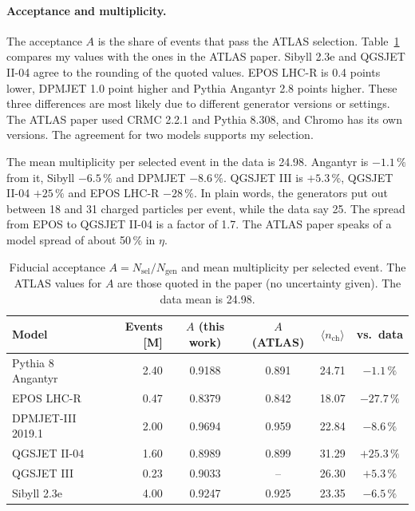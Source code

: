 \documentclass[11pt,a4paper]{article}
\newcommand{\nch}{\ensuremath{n_{\mathrm{ch}}}}
\begin{document}
\paragraph{Acceptance and multiplicity.}
The acceptance $A$ is the share of events that pass the ATLAS selection.
Table~\ref{tab:acc} compares my values with the ones in the ATLAS paper.
Sibyll 2.3e and QGSJET II-04 agree to the rounding of the quoted values.
EPOS LHC-R is 0.4 points lower, DPMJET 1.0 point higher and Pythia Angantyr 2.8 points higher.
These three differences are most likely due to different generator versions or settings.
The ATLAS paper used CRMC 2.2.1 and Pythia 8.308, and Chromo has its own versions.
The agreement for two models supports my selection.

The mean multiplicity per selected event in the data is 24.98.
Angantyr is $-1.1\,\%$ from it, Sibyll $-6.5\,\%$ and DPMJET $-8.6\,\%$.
QGSJET III is $+5.3\,\%$, QGSJET II-04 $+25\,\%$ and EPOS LHC-R $-28\,\%$.
In plain words, the generators put out between 18 and 31 charged particles per event, while the data say 25.
The spread from EPOS to QGSJET II-04 is a factor of 1.7.
The ATLAS paper speaks of a model spread of about 50\,\% in $\eta$.

\begin{table}[!htbp]
\centering
\small
\caption{Fiducial acceptance $A=N_{\mathrm{sel}}/N_{\mathrm{gen}}$ and mean multiplicity per selected event. The ATLAS values for $A$ are those quoted in the paper (no uncertainty given). The data mean is 24.98.}
\label{tab:acc}
\begin{tabular}{@{}lrcccc@{}}
\toprule
Model & Events [M] & $A$ (this work) & $A$ (ATLAS) & $\langle\nch\rangle$ & vs.\ data\\
\midrule
Pythia 8 Angantyr & 2.40 & 0.9188 & 0.891 & 24.71 & $-1.1\,\%$\\
EPOS LHC-R & 0.47 & 0.8379 & 0.842 & 18.07 & $-27.7\,\%$\\
DPMJET-III 2019.1 & 2.00 & 0.9694 & 0.959 & 22.84 & $-8.6\,\%$\\
QGSJET II-04 & 1.60 & 0.8989 & 0.899 & 31.29 & $+25.3\,\%$\\
QGSJET III & 0.23 & 0.9033 & -- & 26.30 & $+5.3\,\%$\\
Sibyll 2.3e & 4.00 & 0.9247 & 0.925 & 23.35 & $-6.5\,\%$\\
\bottomrule
\end{tabular}
\end{table}
\end{document}
